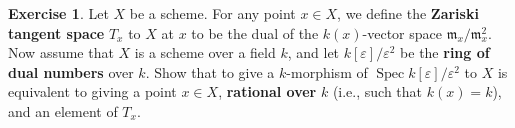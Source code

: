 \documentclass[]{pcmi}
\theoremstyle{plain}
\theoremstyle{definition}
\newtheorem{Exercise}[equation]{Exercise}
\theoremstyle{remark}
\begin{document}
\begin{Exercise}
    Let $X$ be a scheme. For any point $x \in X$, we define the \textbf{Zariski tangent space} $T_x$ to $X$ at $x$ to be the dual of the $k(x)$-vector space $\mathfrak{m}_x/\mathfrak{m}_x^2$. Now assume that $X$ is a scheme over a field $k$, and let $k[\varepsilon]/\varepsilon^2$ be the \textbf{ring of dual numbers} over $k$. Show that to give a $k$-morphism of $\operatorname{Spec} k[\varepsilon]/\varepsilon^2$ to $X$ is equivalent to giving a point $x \in X$, \textbf{rational over} $k$ (i.e., such that $k(x) = k$), and an element of $T_x$.
\end{Exercise}














%    
%
%
%
%             
%   
%
%  

\bibspread



\vfill\eject
\end{document}

